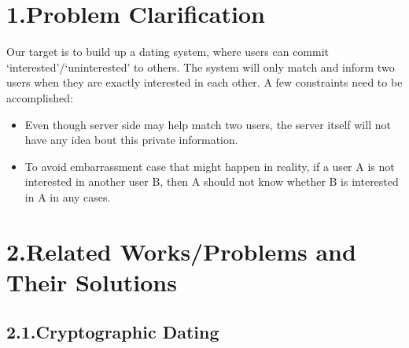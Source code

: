 \documentclass{article}
\begin{document}
\mdxtitleblockstart{}
\mdxauthorstart{}
\mdxauthorend\mdtitleauthorrunning{}{}\mdxtitleblockend%

\section{1.\hspace*{0.5em}Problem Clarification}\label{sec-problem-clarification}%

\noindent{}Our target is to build up a dating system, where users can commit \textquoteleft{}interested\textquoteright{}/\textquoteleft{}uninterested\textquoteright{} to others. The system will only match and inform two users when they are exactly interested in each other. A few constraints need to be accomplished:%

\begin{itemize}[noitemsep,topsep=\mdcompacttopsep]%

\item{}Even though server side may help match two users, the server itself will not have any idea bout this private information.%

\item{}To avoid embarrassment case that might happen in reality, if a user A is not interested in another user B, then A should not know whether B is interested in A in any cases.%
\end{itemize}%

\section{2.\hspace*{0.5em}Related Works/Problems and Their Solutions}\label{sec-related-worksproblems-and-their-solutions}%

\subsection{2.1.\hspace*{0.5em}Cryptographic Dating}\label{sec-cryptographic-dating}%
\end{document}
